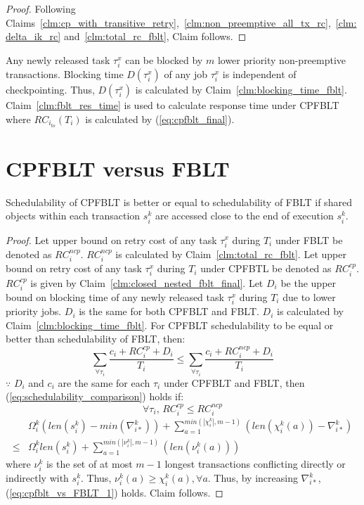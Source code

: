 %
\begin{proof}
%
Following Claims~\ref{clm:cp_with_transitive_retry},~\ref{clm:non_preemptive_all_tx_rc},~\ref{clm:delta_ik_rc}  and~\ref{clm:total_rc_fblt}, Claim follows.
%
\end{proof}
%
Any newly released task $\tau_{i}^{x}$ can be blocked by $m$ lower priority non-preemptive transactions. Blocking time $D(\tau_i^x)$ of any job $\tau_i^x$ is independent of checkpointing. Thus, $D(\tau_i^x)$ is calculated by Claim~\ref{clm:blocking_time_fblt}. Claim~\ref{clm:fblt_res_time} is used to calculate response time under CPFBLT where $RC_{i_{to}}(T_{i})$ is calculated by (\ref{eq:cpfblt_final}).
%
\section{CPFBLT versus FBLT}\label{sec:schedulabiltiy comparison}
%
\begin{clm}\label{clm:cp_ncp_fblt_schedulabiltiy_comp}
%
Schedulability of CPFBLT is better or equal to schedulability of FBLT if shared objects within each transaction $s_i^k$ are accessed close to the end of execution $s_i^k$.
%
\end{clm}
%
\begin{proof}
%
Let upper bound on retry cost of any task $\tau_{i}^{x}$ during $T_{i}$ under FBLT be denoted as $RC_{i}^{ncp}$. $RC_{i}^{ncp}$ is calculated by Claim~\ref{clm:total_rc_fblt}. Let upper bound on retry cost of any task $\tau_{i}^{x}$ during $T_{i}$ under CPFBTL be denoted as $RC_{i}^{cp}$. $RC_{i}^{cp}$ is given by Claim~\ref{clm:closed_nested_fblt_final}. Let $D_{i}$ be the upper bound on blocking time of any newly released task $\tau_{i}^{x}$ during $T_{i}$ due to lower priority jobs. $D_{i}$ is the same for both CPFBLT and FBLT. $D_{i}$ is calculated by Claim~\ref{clm:blocking_time_fblt}. For CPFBLT schedulability to be equal or better than schedulability of FBLT, then: 
%
\begin{equation}
\sum_{\forall\tau_{i}}\frac{c_{i}+RC_{i}^{cp}+D_{i}}{T_{i}}\le\sum_{\forall\tau_{i}}\frac{c_{i}+RC_{i}^{ncp}+D_{i}}{T_{i}}\label{eq:schedulability_comparison}
\end{equation}
$\because$ $D_{i}$ and $c_{i}$ are the same for each $\tau_{i}$
under CPFBLT and FBLT, then (\ref{eq:schedulability_comparison})
holds if:
\[
\forall\tau_{i},\, RC_{i}^{cp}\le RC_{i}^{ncp}
\]
%
\begin{eqnarray}
 & \Omega_{i}^{k}\left(len\left(s_{i}^{k}\right)-min\left(\nabla_{i*}^{k}\right)\right)+\sum_{a=1}^{min\left(|\chi_{i}^{k}|,m-1\right)}\left(len\left(\chi_{i}^{k}(a)\right)-\nabla_{i*}^{k}\right)\nonumber\\
\le & \Omega_{i}^{k}len\left(s_{i}^{k}\right)+\sum_{a=1}^{min\left(|\nu_{i}^{k}|,m-1\right)}\left(len\left(\nu_{i}^{k}(a)\right)\right)
\label{eq:cpfblt_vs_FBLT_1}
\end{eqnarray}
%
where $\nu_i^k$ is the set of at most $m-1$ longest transactions conflicting directly or indirectly with $s_i^k$. Thus, $\nu_i^k(a) \ge \chi_i^k(a), \forall a$. Thus, by increasing $\nabla_{i*}^k$, (\ref{eq:cpfblt_vs_FBLT_1}) holds. Claim follows.
%
\end{proof}
%
